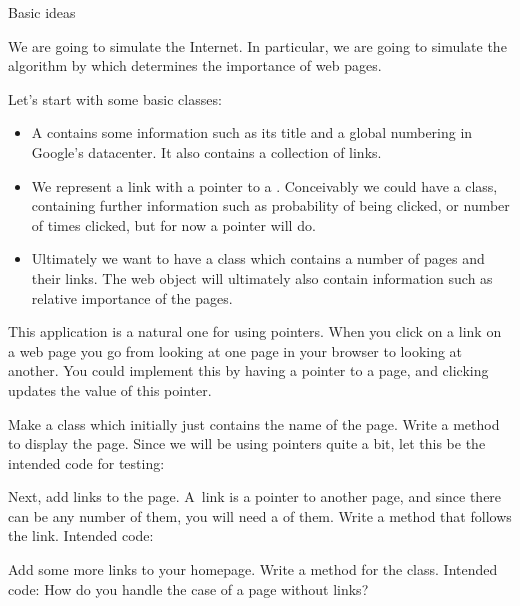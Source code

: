 
 {Basic ideas}

We are going to simulate the Internet. In particular, we are going to
simulate the  algorithm by which
 determines the importance of web pages.

Let's start with some basic classes: 
\begin{itemize}
\item A  contains some information such as its title and a
  global numbering in Google's datacenter. It also contains a
  collection of links.
\item We represent a link with a pointer to a . Conceivably
  we could have a  class, containing further
  information such as probability of being clicked, or number of times
  clicked, but for now a pointer will do.
\item Ultimately we want to have a class  which contains a
  number of pages and their links. The web object will ultimately also
  contain information such as relative importance of the pages.
\end{itemize}

This application is a natural one for using pointers. When you click
on a link on a web page you go from looking at one page in your
browser to looking at another. You could implement this by having a
pointer to a page, and clicking updates the value of this pointer.

\begin{exercise}
  Make a class  which initially just contains the name of the
  page. Write a method to display the page. Since we will be using
  pointers quite a bit, let this be the intended code for testing:

  Next, add links to the page. A~link is a pointer to
  another page, and since there can be any number of them, you will
  need a  of them.
  Write a method  that follows the link. Intended code:
\end{exercise}

\begin{exercise}
  Add some more links to your homepage. Write a method
   for the  class. Intended code:
  How do you handle the case of a page without links?
\end{exercise}

